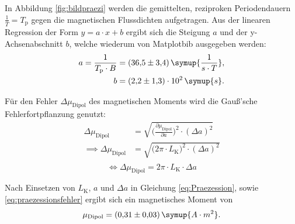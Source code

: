 In Abbildung \eqref{fig:bildpraezi} werden die gemittelten, reziproken Periodendauern $\frac{1}{\bar{T}} = T_{\text{p}}$ gegen die magnetischen 
Flussdichten aufgetragen. 
Aus der linearen Regression der Form $y=a\cdot x +b$ ergibt sich die Steigung $a$ und der y-Achsenabschnitt $b$, welche wiederum von Matplotbib ausgegeben werden:
\begin{equation*} 
\begin{aligned}
a = \frac{1}{T_{\text{p}} \cdot B} &= (36{,}5 \pm 3{,}4)\, \symup{\frac{1}{s\cdot T}}, \\
b &= (2{,}2 \pm 1{,}3)\cdot 10^2 \, \symup{s}. 
\end{aligned} 
\end{equation*}

Für den Fehler $\Delta \mu_{\text{Dipol}}$ des magnetischen Moments wird die Gauß'sche Fehlerfortpflanzung genutzt:
\begin{equation*}
\begin{aligned}
\Delta{\mu_{\text{Dipol}}} &= \sqrt{\biggl(\frac{\partial \mu_{\text{Dipol}}}{\partial a}\biggr)^2 \cdot (\Delta a)^2} \\
\implies \Delta{\mu_{\text{Dipol}}} &= \sqrt{\biggl( 2\pi \cdot L_{\text{K}}\biggr)^2 \cdot (\Delta a)^2} \\
\end{aligned}
\end{equation*}
\begin{equation}
\iff \Delta{\mu_{\text{Dipol}}} = 2\pi \cdot L_{\text{K}} \cdot \Delta a
\label{eq:praezessionsfehler}
\end{equation}

Nach Einsetzen von $L_{\text{K}}$, $a$ und $\Delta a$ in Gleichung \eqref{eq:Praezession}, sowie \eqref{eq:praezessionsfehler} ergibt sich ein magnetisches Moment von
\begin{equation*}
\mu_{\text{Dipol}} = (0{,}31 \pm 0{,}03)\, \symup{A \cdot m^2}.
\end{equation*}

